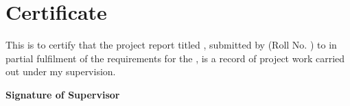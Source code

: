 \section*{Certificate}
This is to certify that the project report titled \emph{\ttitle}, submitted by \authorname{} (Roll No. \rn) to \univname{} in partial fulfilment of the requirements for the \degree, is a record of project work carried out under my supervision.

\vspace{2cm}
\begin{flushright}
\textbf{Signature of Supervisor}\\[0.5cm]
\supname\\
\deptname
\end{flushright}
\clearpage
